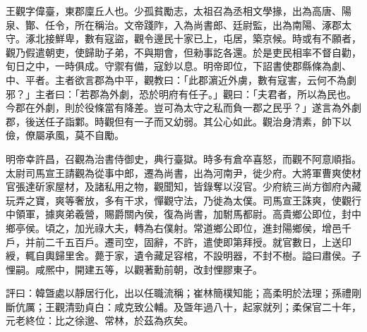\begin{pinyinscope}
 
 
 王觀字偉臺，東郡廩丘人也。少孤貧勵志，太祖召為丞相文學掾，出為高唐、陽泉、酇、任令，所在稱治。文帝踐阼，入為尚書郎、廷尉監，出為南陽、涿郡太守。涿北接鮮卑，數有寇盜，觀令邊民十家已上，屯居，築京候。時或有不願者，觀乃假遣朝吏，使歸助子弟，不與期會，但勑事訖各還。於是吏民相率不督自勸，旬日之中，一時俱成。守禦有備，寇鈔以息。明帝即位，下詔書使郡縣條為劇、中、平者。主者欲言郡為中平，觀教曰：「此郡濵近外虜，數有寇害，云何不為劇邪？」主者曰：「若郡為外劇，恐於明府有任子。」觀曰：「夫君者，所以為民也。今郡在外劇，則於役條當有降差。豈可為太守之私而負一郡之民乎？」遂言為外劇郡，後送任子詣鄴。時觀但有一子而又幼弱。其公心如此。觀治身清素，帥下以儉，僚屬承風，莫不自勵。
 
 
 
 
 明帝幸許昌，召觀為治書侍御史，典行臺獄。時多有倉卒喜怒，而觀不阿意順指。太尉司馬宣王請觀為從事中郎，遷為尚書，出為河南尹，徙少府。大將軍曹爽使材官張達斫家屋材，及諸私用之物，觀聞知，皆錄奪以沒官。少府統三尚方御府內藏玩弄之寶，爽等奢放，多有干求，憚觀守法，乃徙為太僕。司馬宣王誅爽，使觀行中領軍，據爽弟羲營，賜爵關內侯，復為尚書，加駙馬都尉。高貴鄉公即位，封中鄉亭侯。頃之，加光祿大夫，轉為右僕射。常道鄉公即位，進封陽鄉侯，增邑千戶，并前二千五百戶。遷司空，固辭，不許，遣使即第拜授。就官數日，上送印綬，輒自輿歸里舍。薨于家，遺令藏足容棺，不設明器，不封不樹。謚曰肅侯。子悝嗣。咸熈中，開建五等，以觀著勳前朝，改封悝膠東子。
 
 
 
 
 評曰：韓曁處以靜居行化，出以任職流稱；崔林簡樸知能；高柔明於法理；孫禮剛斷伉厲；王觀清勁貞白：咸克致公輔。及曁年過八十，起家就列；柔保官二十年，元老終位：比之徐邈、常林，於茲為疚矣。
 
 
\end{pinyinscope}